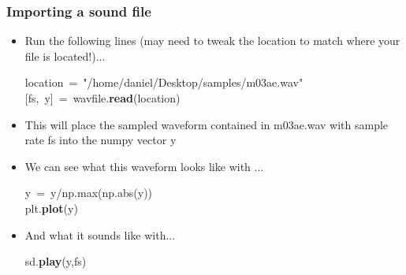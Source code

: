 \documentclass{beamer}\usepackage[]{graphicx}\usepackage[]{color}
\makeatletter
\newcommand{\hlstr}[1]{\textcolor[rgb]{0.192,0.494,0.8}{#1}}%
\newcommand{\hlopt}[1]{\textcolor[rgb]{0,0,0}{#1}}%
\newcommand{\hlstd}[1]{\textcolor[rgb]{0.345,0.345,0.345}{#1}}%
\newcommand{\hlkwb}[1]{\textcolor[rgb]{0.69,0.353,0.396}{#1}}%
\newcommand{\hlkwd}[1]{\textcolor[rgb]{0.737,0.353,0.396}{\textbf{#1}}}%
\newenvironment{kframe}{%
 \def\at@end@of@kframe{}%
 \ifinner\ifhmode%
  \def\at@end@of@kframe{\end{minipage}}%
  \begin{minipage}{\columnwidth}%
 \fi\fi%
 \def\FrameCommand##1{\hskip\@totalleftmargin \hskip-\fboxsep
 \colorbox{shadecolor}{##1}\hskip-\fboxsep
     \hskip-\linewidth \hskip-\@totalleftmargin \hskip\columnwidth}%
 \MakeFramed {\advance\hsize-\width
   \@totalleftmargin\z@ \linewidth\hsize
   \@setminipage}}%
 {\par\unskip\endMakeFramed%
 \at@end@of@kframe}
\newenvironment{knitrout}{}{} %
\makeatother
\begin{document}
\begin{frame}[fragile]
\frametitle{Importing a sound file}
\begin{itemize}
	\item Run the following lines (may need to tweak the location to match where your file is located!)...
\begin{knitrout}
\color{fgcolor}\begin{kframe}
\noindent
\ttfamily
\hlstd{location\ }\hlopt{=\ }\hlstd{}\hlstr{"/home/daniel/Desktop/samples/m03ae.wav"}\hlstd{}\hspace*{\fill}\\
\hlopt{{[}}\hlstd{fs}\hlopt{,\ }\hlstd{y}\hlopt{{]}\ =\ }\hlstd{wavfile}\hlopt{.}\hlstd{}\hlkwd{read}\hlstd{}\hlopt{(}\hlstd{location}\hlopt{)}\hlstd{}\hspace*{\fill}
\mbox{}
\normalfont
\end{kframe}
\end{knitrout}

	\item This will place the sampled waveform contained in m03ae.wav with sample rate fs into the numpy vector y

	\item We can see what this waveform looks like with ...

\begin{knitrout}
\color{fgcolor}\begin{kframe}
\noindent
\ttfamily
\hlstd{y\ }\hlopt{=\ }\hlstd{y}\hlopt{/}\hlstd{np}\hlopt{.}\hlstd{}\hlkwb{max}\hlstd{}\hlopt{(}\hlstd{np}\hlopt{.}\hlstd{}\hlkwb{abs}\hlstd{}\hlopt{(}\hlstd{y}\hlopt{))}\hspace*{\fill}\\
\hlstd{plt}\hlopt{.}\hlstd{}\hlkwd{plot}\hlstd{}\hlopt{(}\hlstd{y}\hlopt{)}\hlstd{}\hspace*{\fill}
\mbox{}
\normalfont
\end{kframe}
\end{knitrout}

	\item And what it sounds like with...

\begin{knitrout}
\color{fgcolor}\begin{kframe}
\noindent
\ttfamily
\hlstd{sd}\hlopt{.}\hlstd{}\hlkwd{play}\hlstd{}\hlopt{(}\hlstd{y}\hlopt{,}\hlstd{fs}\hlopt{)}\hlstd{}\hspace*{\fill}
\mbox{}
\normalfont
\end{kframe}
\end{knitrout}
\end{itemize}
\end{frame}
\end{document}
